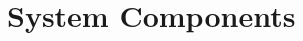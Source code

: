 \documentclass[compress,red]{beamer}
\begin{document}
%
%
%
%

\section{System Components}
\end{document}
